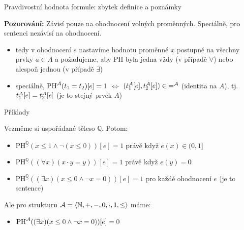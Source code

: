 \documentclass{beamer}
\begin{document}
\begin{frame}{Pravdivostní hodnota formule: zbytek definice a poznámky}
    
    \pause

    \pause
    \textbf{Pozorování:} Závisí pouze na ohodnocení volných proměnných. Speciálně, pro sentenci nezávisí na ohodnocení.

    \pause
    \begin{itemize}
        \item tedy v ohodnocení $e$ nastavíme hodnotu proměnné $x$ postupně na všechny prvky $a\in A$ a požadujeme, aby PH byla jedna vždy (v případě $\forall$) nebo alespoň jednou (v případě $\exists$)\pause
        \item speciálně, $\mathrm{PH}^{\mathcal{A}}(t_1=t_2)[e]=1$ $\Leftrightarrow$ $(t_1^{\mathcal{A}}[e],t_2^{\mathcal{A}}[e])\in {=^{\mathcal{A}}}$ (\alert{identita} na $A$), tj. $t_1^{\mathcal{A}}[e]=t_2^{\mathcal{A}}[e]$ (je to stejný prvek $A$)
    \end{itemize}
    
\end{frame}


\begin{frame}{Příklady}
    
    Vezměme si uspořádané těleso $\underline{\mathbb Q}$. Potom:\pause
    \begin{itemize}
        \item $\mathrm{PH}^{\underline{\mathbb Q}}(x\leq 1 \land \neg (x\leq 0))[e]=1$ právě když $e(x)\in (0,1]$\pause
        \item $\mathrm{PH}^{\underline{\mathbb Q}}((\forall x)(x\cdot y = y))[e]=1$ právě když $e(y)=0$\pause
        \item $\mathrm{PH}^{\underline{\mathbb Q}}((\exists x)(x \leq 0 \land \neg x=0))[e]=1$ pro každé ohodnocení $e$ (je to sentence)\pause
    \end{itemize}   
    Ale pro strukturu $\mathcal{A}=\langle \mathbb N,+,-,0,\cdot,1,\leq\rangle$ máme:\pause 
    \begin{itemize}
        \item $\mathrm{PH}^{\mathcal{A}}((\exists x)(x \leq 0 \land \neg x=0))[e]=0$ 
    \end{itemize}     

\end{frame}
\end{document}
